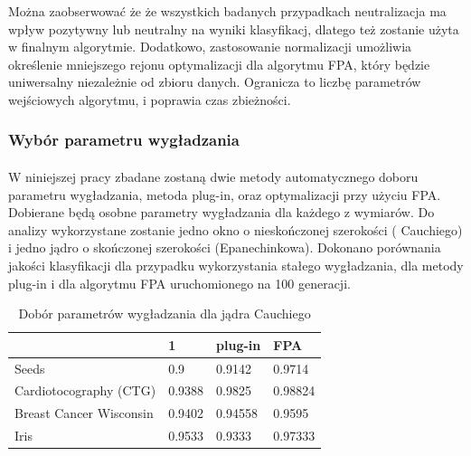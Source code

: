 \documentclass[a4paper,12pt,twoside]{article}
\begin{document}
Można zaobserwować że że wszystkich badanych przypadkach neutralizacja ma wpływ pozytywny lub neutralny na wyniki klasyfikacj, dlatego też zostanie użyta w finalnym algorytmie. Dodatkowo, zastosowanie normalizacji umożliwia określenie mniejszego rejonu optymalizacji dla algorytmu FPA, który będzie uniwersalny niezależnie od zbioru danych. Ogranicza to liczbę parametrów wejściowych algorytmu, i poprawia czas zbieżności.
\subsubsection{Wybór parametru wygładzania}
\paragraph{}
W niniejszej pracy zbadane zostaną dwie metody automatycznego doboru parametru wygładzania, metoda plug-in, oraz optymalizacji przy użyciu FPA. Dobierane będą osobne parametry wygładzania dla każdego z wymiarów. Do analizy wykorzystane zostanie jedno okno o nieskończonej szerokości ( Cauchiego) i jedno jądro o skończonej szerokości (Epanechinkowa).  Dokonano porównania jakości klasyfikacji dla przypadku wykorzystania stałego wygładzania, dla metody plug-in i dla algorytmu FPA uruchomionego na 100 generacji. 
\begin{table}[H]
\centering
\caption{Dobór parametrów wygładzania dla jądra Cauchiego}
\label{plugvsfpa}
\begin{tabular}{|l|l|l|l|}
\hline
          & 1 & plug-in & FPA\\ \hline
Seeds   & 0.9 & 0.9142 &0.9714 \\ \hline
Cardiotocography (CTG)   & 0.9388 & 0.9825 & 0.98824 \\ \hline
Breast Cancer Wisconsin  & 0.9402 & 0.94558 &0.9595\\ \hline
Iris  & 0.9533 & 0.9333 &0.97333\\ \hline
\end{tabular}
\end{table}
\end{document}
